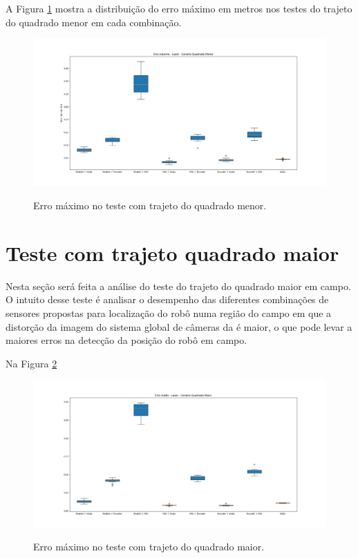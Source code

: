 \documentclass[acronym, symbols, table]{fei}
\begin{document}
	A Figura \ref{fig:erro_maximo_distancia_quad_menor} mostra a distribuição do erro máximo em metros nos testes do trajeto do quadrado menor em cada combinação.  
	
	\begin{figure}[!htb]
		\centering
		\caption{Erro máximo no teste com trajeto do quadrado menor.}
		\includegraphics[width=1.0\textwidth]{../Dados/Graficos-Resultados/erro_maximo_distancia_quadrado_menor.png}
		\label{fig:erro_maximo_distancia_quad_menor}
	\end{figure}

	\section{Teste com trajeto quadrado maior}
	
		Nesta seção será feita a análise do teste do trajeto do quadrado maior em campo. O intuito desse teste é analisar o desempenho das diferentes combinações de sensores propostas para localização do robô numa região do campo em que a distorção da imagem do sistema global de câmeras da  é maior, o que pode levar a maiores erros na detecção da posição do robô em campo.
		
		Na Figura \ref{fig:erro_medio_distancia_quad_maior}
		
		\begin{figure}[!htb]
			\centering
			\caption{Erro máximo no teste com trajeto do quadrado maior.}
			\includegraphics[width=1.0\textwidth]{../Dados/Graficos-Resultados/erro_medio_distancia_quadrado_maior.png}
			\label{fig:erro_medio_distancia_quad_maior}
		\end{figure}
	
\end{document}
